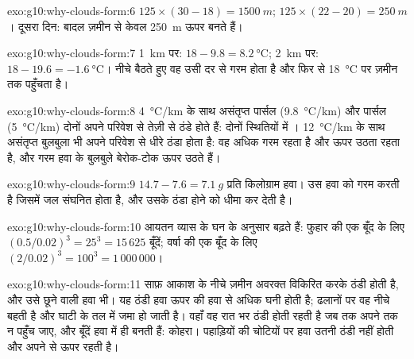 \begin{solution}{exo:g10:why-clouds-form:6}
$125 \times (30 - 18) = \qty{1500}{m}$; $125 \times (22 - 20) =
\qty{250}{m}$। दूसरा दिन: बादल ज़मीन से केवल \qty{250}{m} ऊपर
बनते हैं।
\end{solution}

\begin{solution}{exo:g10:why-clouds-form:7}
\qty{1}{km} पर: $18 - 9.8 = \qty{8.2}{\degreeCelsius}$; \qty{2}{km} पर:
$18 - 19.6 = \qty{-1.6}{\degreeCelsius}$। नीचे बैठते हुए वह उसी दर से गरम होता है
और फिर से \qty{18}{\degreeCelsius} पर ज़मीन तक पहुँचता है।
\end{solution}

\begin{solution}{exo:g10:why-clouds-form:8}
\qty{4}{\degreeCelsius/km} के साथ असंतृप्त पार्सल
(\qty{9.8}{\degreeCelsius/km}) और  पार्सल
(\qty{5}{\degreeCelsius/km}) दोनों अपने परिवेश से तेज़ी से ठंडे होते हैं: दोनों
स्थितियों में । \qty{12}{\degreeCelsius/km} के साथ असंतृप्त बुलबुला भी
अपने परिवेश से धीरे ठंडा होता है: वह अधिक गरम रहता है और ऊपर उठता रहता है,
और गरम हवा के बुलबुले बेरोक-टोक ऊपर उठते हैं।
\end{solution}

\begin{solution}{exo:g10:why-clouds-form:9}
$14.7 - 7.6 = \qty{7.1}{g}$ प्रति किलोग्राम हवा।  उस हवा को गरम करती
है जिसमें जल संघनित होता है, और उसके ठंडा होने को धीमा कर देती है।
\end{solution}

\begin{solution}{exo:g10:why-clouds-form:10}
आयतन व्यास के घन के अनुसार बढ़ते हैं: फुहार की एक बूँद के लिए $(0.5/0.02)^3 = 25^3 = 15\,625$
बूँदें; वर्षा की एक बूँद के लिए $(2/0.02)^3 = 100^3 = 1\,000\,000$।
\end{solution}

\begin{solution}{exo:g10:why-clouds-form:11}
साफ़ आकाश के नीचे ज़मीन अवरक्त विकिरित करके ठंडी होती है, और उसे छूने वाली हवा भी।
यह ठंडी हवा ऊपर की हवा से अधिक घनी होती है; ढलानों पर वह नीचे बहती है और घाटी के
तल में जमा हो जाती है। वहाँ वह रात भर ठंडी होती रहती है जब तक अपने  तक न पहुँच
जाए, और बूँदें हवा में ही बनती हैं: कोहरा। पहाड़ियों की चोटियों पर हवा उतनी ठंडी नहीं
होती और अपने
 से ऊपर रहती है।
\end{solution}

